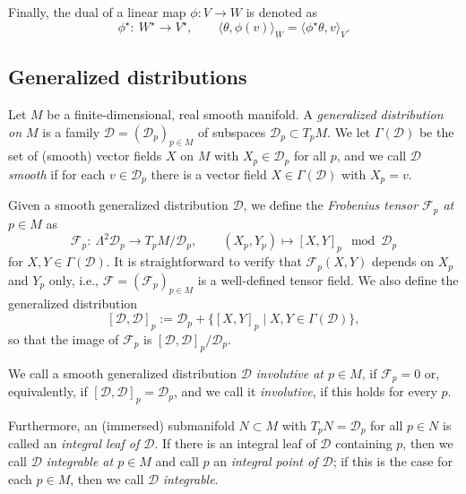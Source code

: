 \documentclass[pdftex]{sigma}
\numberwithin{equation}{section}
\newcommand{\ee}{\end{equation}}
\newcommand{\dcal}{\mathcal{D}}
\begin{document}
Finally, the dual of a linear map $\phi\colon V \to W$ is denoted as
\[
\phi^\star\colon\ W^\star \longrightarrow V^\star, \qquad \langle \theta, \phi(v) \rangle_W = \langle \phi^\star \theta, v \rangle_V.
\]


\subsection{Generalized distributions}


Let $M$ be a finite-dimensional, real smooth manifold.
A {\em generalized distribution on $M$} is a family $\dcal = (\dcal_p)_{p \in M}$ of subspaces $\dcal_p \subset T_pM$.
We let $\Gamma(\dcal)$ be the set of (smooth) vector fields $X$ on $M$ with $X_p \in \dcal_p$ for all $p$, and we call $\dcal$ {\em smooth} if for each $v \in \dcal_p$ there is a vector field $X \in \Gamma(\dcal)$ with $X_p = v$.

Given a smooth generalized distribution $\dcal$, we define the {\em Frobenius tensor ${\mathcal F}_p$ at $p \in M$} as
\[
{\mathcal F}_p\colon\ \Lambda^2 \dcal_p \longrightarrow T_pM/\dcal_p, \qquad (X_p, Y_p) \longmapsto [X,Y]_p \mod \dcal_p
\]
for $X, Y \in \Gamma(\dcal)$. It is straightforward to verify that ${\mathcal F}_p(X, Y)$ depends on $X_p$ and $Y_p$ only, i.e., ${\mathcal F} = ({\mathcal F}_p)_{p \in M}$ is a well-defined tensor field. We also define the generalized distribution
\[%
{}[\dcal, \dcal]_p := \dcal_p + \{ [X, Y]_p \mid X, Y \in \Gamma(\dcal)\},
\]
so that the image of ${\mathcal F}_p$ is $[\dcal, \dcal]_p/\dcal_p$.

\begin{Definition}
We call a smooth generalized distribution $\dcal$ {\em involutive at $p \in M$}, if ${\mathcal F}_p = 0$ or, equivalently, if $[\dcal, \dcal]_p = \dcal_p$, and we call it {\em involutive}, if this holds for every $p$.

Furthermore, an (immersed) submanifold $N \subset M$ with $T_pN = \dcal_p$ for all $p \in N$ is called an {\em integral leaf of $\dcal$}. If there is an integral leaf of $\dcal$ containing $p$, then we call $\dcal$ {\em integrable at $p \in M$} and call $p$ an {\em integral point of $\dcal$}; if this is the case for each $p \in M$, then we call $\dcal$ {\em integrable}.
\end{Definition}
\end{document}
